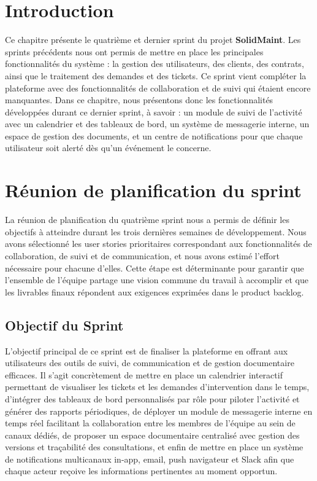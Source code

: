 ﻿\section*{Introduction}

Ce chapitre présente le quatrième et dernier sprint du projet \textbf{SolidMaint}. Les sprints précédents nous ont permis de mettre en place les principales fonctionnalités du système : la gestion des utilisateurs, des clients, des contrats, ainsi que le traitement des demandes et des tickets. Ce sprint vient compléter la plateforme avec des fonctionnalités de collaboration et de suivi qui étaient encore manquantes.
\newline
Dans ce chapitre, nous présentons donc les fonctionnalités développées durant ce dernier sprint, à savoir : un module de suivi de l'activité avec un calendrier et des tableaux de bord, un système de messagerie interne, un espace de gestion des documents, et un centre de notifications pour que chaque utilisateur soit alerté dès qu'un événement le concerne.



\section{Réunion de planification du sprint}
\label{sec:planning_sprint4}
La réunion de planification du quatrième sprint nous a permis de définir les objectifs à atteindre durant les trois dernières semaines de développement. Nous avons sélectionné les user stories prioritaires correspondant aux fonctionnalités de collaboration, de suivi et de communication, et nous avons estimé l'effort nécessaire pour chacune d'elles. Cette étape est déterminante pour garantir que l'ensemble de l'équipe partage une vision commune du travail à accomplir et que les livrables finaux répondent aux exigences exprimées dans le product backlog.

\subsection{Objectif du Sprint}
L'objectif principal de ce sprint est de finaliser la plateforme en offrant aux utilisateurs des outils de suivi, de communication et de gestion documentaire efficaces. Il s'agit concrètement de mettre en place un calendrier interactif permettant de visualiser les tickets et les demandes d'intervention dans le temps, d'intégrer des tableaux de bord personnalisés par rôle pour piloter l'activité et générer des rapports périodiques, de déployer un module de messagerie interne en temps réel facilitant la collaboration entre les membres de l'équipe au sein de canaux dédiés, de proposer un espace documentaire centralisé avec gestion des versions et traçabilité des consultations, et enfin de mettre en place un système de notifications multicanaux in-app, email, push navigateur et Slack afin que chaque acteur reçoive les informations pertinentes au moment opportun.

